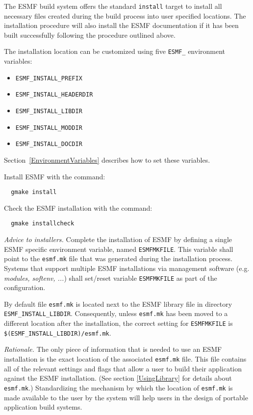 The ESMF build system offers the standard {\tt install} target to install all
necessary files created during the build process into user specified locations.
The installation procedure will also install the ESMF documentation if it has
been built successfully following the procedure outlined above.

The installation location can be customized using five {\tt ESMF\_} environment
variables:
\begin{itemize}
\item {\tt ESMF\_INSTALL\_PREFIX}
\item {\tt ESMF\_INSTALL\_HEADERDIR}
\item {\tt ESMF\_INSTALL\_LIBDIR}
\item {\tt ESMF\_INSTALL\_MODDIR}
\item {\tt ESMF\_INSTALL\_DOCDIR}
\end{itemize}

Section~\ref{EnvironmentVariables} describes how to set these variables.

Install ESMF with the command:
\begin{verbatim}
  gmake install
\end{verbatim}

Check the ESMF installation with the command:
\begin{verbatim}
  gmake installcheck
\end{verbatim}

{\em Advice to installers.} Complete the installation of ESMF by defining a single ESMF specific environment variable, named {\tt ESMFMKFILE}. This variable shall point to the {\tt esmf.mk} file that was generated during the installation process. Systems that support multiple ESMF installations via management software (e.g. {\em modules, softenv, ...}) shall set/reset variable {\tt ESMFMKFILE} as part of the configuration. 

By default file {\tt esmf.mk} is located next to the ESMF library file in  directory {\tt ESMF\_INSTALL\_LIBDIR}. Consequently, unless {\tt esmf.mk} has been moved to a different location after the installation, the correct setting for {\tt ESMFMKFILE} is {\tt \$(ESMF\_INSTALL\_LIBDIR)/esmf.mk}.

{\em Rationale.} The only piece of information that is needed to use an ESMF installation is the exact location of the associated {\tt esmf.mk} file. This file contains all of the relevant settings and flags that allow a user to build their application against the ESMF installation. (See section \ref{UsingLibrary} for details about {\tt esmf.mk}.) Standardizing the mechanism by which the location of {\tt esmf.mk} is made available to the user by the system will help users in the design of portable application build systems.

 


